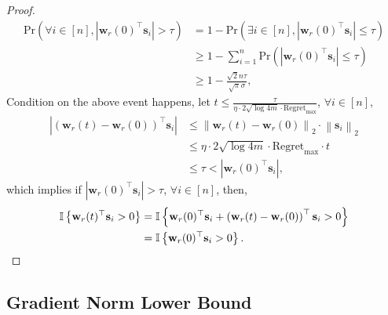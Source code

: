 \documentclass[10pt]{article}
\def\rvs{{\mathbf{s}}}
\def\rvw{{\mathbf{w}}}
\def\pr{{\text{Pr}}}
\def\regret{{\text{Regret}}}
\def\sI{{\mathbb{I}}}
\begin{document}
\begin{proof}
\begin{equation*}
\begin{split}
	\pr\left(\forall i \in [n], \left| \rvw_r(0)^\top \rvs_i \right| > \tau\right) &= 1 - \pr\left(\exists i \in [n], \left| \rvw_r(0)^\top \rvs_i \right| \le \tau\right) \\
	&\ge 1 - \sum\limits_{i=1}^{n}{ \pr\left(\left| \rvw_r(0)^\top \rvs_i \right| \le \tau\right) } \\
	&\ge 1 - \frac{\sqrt{2}n\tau}{\sqrt{\pi}\sigma},
\end{split}
\end{equation*}
Condition on the above event happens, let $t \le \frac{\tau}{ \eta \cdot 2 \sqrt{\log{4m}} \cdot \regret_{\max} }$, $\forall i \in [n]$,
\begin{equation*}
\begin{split}
	\left| \left( \rvw_r(t) - \rvw_r(0) \right)^\top \rvs_i \right| &\le \left\| \rvw_r(t) - \rvw_r(0) \right\|_2 \cdot \left\| \rvs_i \right\|_2 \\
	&\le \eta \cdot 2 \sqrt{\log{4m}} \cdot \regret_{\max} \cdot t \\
	&\le \tau < \left| \rvw_r(0)^\top \rvs_i \right|,
\end{split}
\end{equation*}
which implies if $\left| \rvw_r(0)^\top \rvs_i \right| > \tau$, $\forall i \in [n]$, then,
\begin{equation*}
\begin{split}
	\sI\left\{ \rvw_r(t)^\top \rvs_i > 0 \right\} &= \sI\left\{ \rvw_r(0)^\top \rvs_i  + \left( \rvw_r(t) - \rvw_r(0) \right)^\top \rvs_i > 0 \right\} \\
	&= \sI\left\{ \rvw_r(0)^\top \rvs_i > 0 \right\}. \qedhere
\end{split}
\end{equation*}
\end{proof}

\subsection{Gradient Norm Lower Bound}
\end{document}
